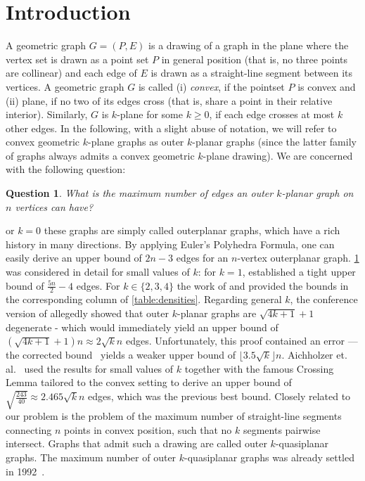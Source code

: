 \documentclass[nolineno,a4paper,USenglish,cleveref,autoref,thm-restate]
{socg}
\newtheorem{question}{Question}
\begin{document}
\section{Introduction}
A geometric graph $G =(P, E)$ is a drawing of a graph in the plane where the vertex set is
drawn as a point set $P$ in general position (that is, no three points are collinear) and each
edge of $E$ is drawn as a straight-line segment between its vertices. A geometric graph $G$ is called (i) \emph{convex}, if the pointset $P$ is convex and (ii) plane, if no two of its edges cross (that is, share a point in their relative interior). Similarly, $G$ is $k$-plane for some $k \geq 0$, if each edge crosses at most $k$ other edges.
In the following, with a slight abuse of notation, we will refer to convex geometric $k$-plane graphs as outer $k$-planar graphs (since the latter family of graphs always admits a convex geometric $k$-plane drawing). 
We are concerned with the following question:
\begin{question}\label{question:core}
What is the maximum number of edges an outer $k$-planar graph on $n$ vertices can have?
\end{question}
or $k=0$ these graphs are simply called outerplanar graphs, which have a rich history in many directions. By applying Euler's Polyhedra Formula, one can easily derive an upper bound of $2n-3$ edges for an $n$-vertex outerplanar graph. \cref{question:core} was considered in detail for small values of $k$: for $k=1$, \cite{DBLP:journals/algorithmica/AuerBBGHNR16} established a tight upper bound of $\frac{5n}{2}-4$ edges. For $k \in \{2,3,4\}$ the work of \cite{DBLP:conf/compgeom/AichholzerOOPSS22} and \cite{ábrego2024bookcrossingnumberscomplete} provided the bounds in the corresponding column of \cref{table:densities}.
Regarding general $k$, the conference version of \cite{chaplick2017beyond} allegedly showed that outer $k$-planar graphs are $\sqrt{4k+1}+1$ degenerate - which would immediately yield an upper bound of $(\sqrt{4k+1}+1)n \approx 2\sqrt{k}n$ edges. Unfortunately, this proof contained an error --- the corrected bound~\cite{DBLP:journals/corr/abs-1708-08723} yields a weaker upper bound of $\lfloor3.5\sqrt{k}\rfloor n$.
Aichholzer et. al.~\cite{DBLP:conf/compgeom/AichholzerOOPSS22} used the results for small values of $k$ together with the famous Crossing Lemma tailored to the convex setting to derive an upper bound of $\sqrt{\frac{243}{40}}\approx 2.465\sqrt{k}n$ edges, which was the previous best bound.
Closely related to our problem is the problem of the maximum number of straight-line segments connecting $n$ points in convex position, such that no $k$ segments pairwise intersect. Graphs that admit such a drawing are called outer $k$-quasiplanar graphs. The maximum number of outer $k$-quasiplanar graphs was already settled in 1992~\cite{quasiplanar}.
\end{document}
